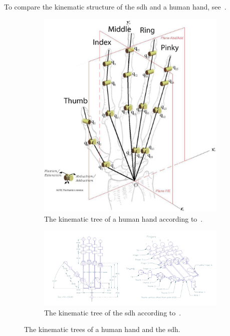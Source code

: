 To compare the kinematic structure of the \gls{sdh} and a human hand, see~.

\begin{figure}[!h]
	\centering
	\begin{subfigure}[b]{0.3\textwidth}
		\centering
		\includegraphics[width=\textwidth]{chapters/appendix/fig/human-hand-kinematics.pdf}
		\caption{The kinematic tree of a human hand according to~\cite{grasp-synthesis-algorithms-for-multifingered-robot-hands}.}
		\label{app:human-hand-kinematics}
	\end{subfigure}
	\hfill
	\begin{subfigure}[b]{0.69\textwidth}
		\centering
		\includegraphics[width=\textwidth]{chapters/appendix/fig/robot-hand-kinematics.pdf}
		\caption{The kinematic tree of the \gls{sdh} according to~\cite{robot-hand-kinematics}. \newline}
		\label{app:robot-hand-kinematics}
	\end{subfigure}
	\caption{The kinematic trees of a human hand and the \gls{sdh}.}
	\label{app:human-and-robot-hand-kinematics}
\end{figure}

